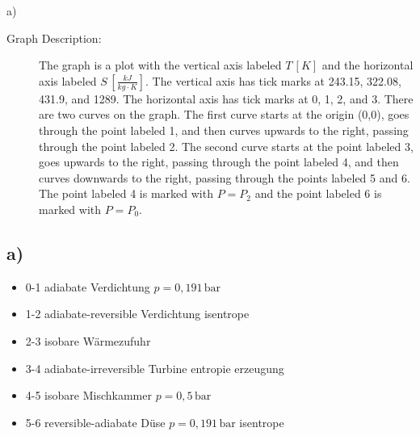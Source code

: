 a)

\begin{description}
    \item[Graph Description:] The graph is a plot with the vertical axis labeled \( T \, [K] \) and the horizontal axis labeled \( S \, \left[ \frac{kJ}{kg \cdot K} \right] \). The vertical axis has tick marks at 243.15, 322.08, 431.9, and 1289. The horizontal axis has tick marks at 0, 1, 2, and 3. There are two curves on the graph. The first curve starts at the origin (0,0), goes through the point labeled 1, and then curves upwards to the right, passing through the point labeled 2. The second curve starts at the point labeled 3, goes upwards to the right, passing through the point labeled 4, and then curves downwards to the right, passing through the points labeled 5 and 6. The point labeled 4 is marked with \( P = P_2 \) and the point labeled 6 is marked with \( P = P_0 \).
\end{description}



\subsection*{a)}
\begin{itemize}
    \item 0-1 adiabate Verdichtung \hfill $p = 0{,}191 \, \text{bar}$
    \item 1-2 adiabate-reversible Verdichtung \hfill isentrope
    \item 2-3 isobare Wärmezufuhr
    \item 3-4 adiabate-irreversible Turbine \hfill entropie erzeugung
    \item 4-5 isobare Mischkammer \hfill $p = 0{,}5 \, \text{bar}$
    \item 5-6 reversible-adiabate Düse \hfill $p = 0{,}191 \, \text{bar}$ \hfill isentrope
\end{itemize}